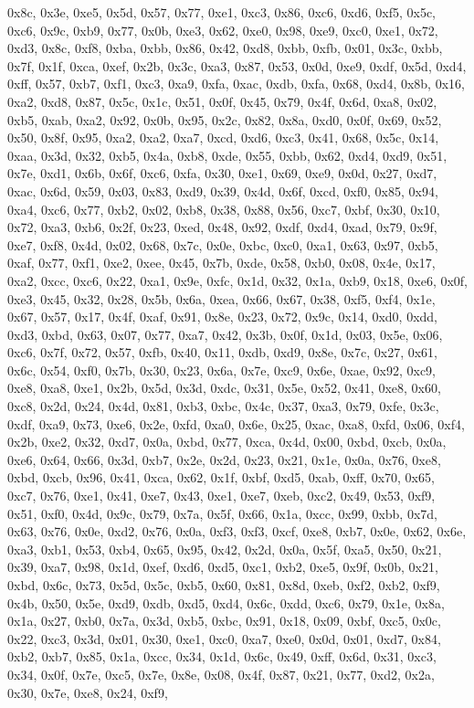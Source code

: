 \documentclass[
]{book}
\begin{document}
0x8c, 0x3e, 0xe5, 0x5d, 0x57, 0x77, 0xe1, 0xc3, 0x86, 0xc6, 0xd6, 0xf5, 0x5c, 0xc6, 0x9c, 0xb9, 0x77, 0x0b, 0xe3, 0x62, 0xe0, 0x98, 0xe9, 0xc0, 0xe1, 0x72, 0xd3, 0x8c, 0xf8, 0xba, 0xbb, 0x86, 0x42, 0xd8, 0xbb, 0xfb, 0x01, 0x3c, 0xbb, 0x7f, 0x1f, 0xca, 0xef, 0x2b, 0x3c, 0xa3, 0x87, 0x53, 0x0d, 0xe9, 0xdf, 0x5d, 0xd4, 0xff, 0x57, 0xb7, 0xf1, 0xc3, 0xa9, 0xfa, 0xac, 0xdb, 0xfa, 0x68, 0xd4, 0x8b, 0x16, 0xa2, 0xd8, 0x87, 0x5c, 0x1c, 0x51, 0x0f, 0x45, 0x79, 0x4f, 0x6d, 0xa8, 0x02, 0xb5, 0xab, 0xa2, 0x92,
0x0b, 0x95, 0x2c, 0x82, 0x8a, 0xd0, 0x0f, 0x69, 0x52, 0x50, 0x8f, 0x95, 0xa2, 0xa2, 0xa7, 0xcd, 0xd6, 0xc3, 0x41, 0x68, 0x5c, 0x14, 0xaa, 0x3d, 0x32, 0xb5, 0x4a, 0xb8, 0xde, 0x55, 0xbb, 0x62, 0xd4, 0xd9, 0x51, 0x7e, 0xd1, 0x6b, 0x6f, 0xc6, 0xfa, 0x30, 0xe1, 0x69, 0xe9, 0x0d, 0x27, 0xd7, 0xac, 0x6d, 0x59, 0x03, 0x83, 0xd9, 0x39, 0x4d, 0x6f, 0xcd, 0xf0, 0x85, 0x94, 0xa4, 0xc6, 0x77, 0xb2, 0x02, 0xb8, 0x38, 0x88, 0x56, 0xc7, 0xbf, 0x30, 0x10, 0x72, 0xa3, 0xb6, 0x2f, 0x23, 0xed, 0x48, 0x92, 0xdf, 0xd4,
0xad, 0x79, 0x9f, 0xe7, 0xf8, 0x4d, 0x02, 0x68, 0x7c, 0x0e, 0xbc, 0xc0, 0xa1, 0x63, 0x97, 0xb5, 0xaf, 0x77, 0xf1, 0xe2, 0xee, 0x45, 0x7b, 0xde, 0x58, 0xb0, 0x08, 0x4e, 0x17, 0xa2, 0xcc, 0xc6, 0x22, 0xa1, 0x9e, 0xfc, 0x1d, 0x32, 0x1a, 0xb9, 0x18, 0xe6, 0x0f, 0xe3, 0x45, 0x32, 0x28, 0x5b, 0x6a, 0xea, 0x66, 0x67, 0x38, 0xf5, 0xf4, 0x1e, 0x67, 0x57, 0x17, 0x4f, 0xaf, 0x91, 0x8e, 0x23, 0x72, 0x9c, 0x14, 0xd0, 0xdd, 0xd3, 0xbd, 0x63, 0x07, 0x77, 0xa7, 0x42, 0x3b, 0x0f, 0x1d, 0x03, 0x5e, 0x06, 0xc6, 0x7f,
0x72, 0x57, 0xfb, 0x40, 0x11, 0xdb, 0xd9, 0x8e, 0x7c, 0x27, 0x61, 0x6c, 0x54, 0xf0, 0x7b, 0x30, 0x23, 0x6a, 0x7e, 0xc9, 0x6e, 0xae, 0x92, 0xc9, 0xe8, 0xa8, 0xe1, 0x2b, 0x5d, 0x3d, 0xdc, 0x31, 0x5e, 0x52, 0x41, 0xe8, 0x60, 0xc8, 0x2d, 0x24, 0x4d, 0x81, 0xb3, 0xbc, 0x4c, 0x37, 0xa3, 0x79, 0xfe, 0x3c, 0xdf, 0xa9, 0x73, 0xe6, 0x2e, 0xfd, 0xa0, 0x6e, 0x25, 0xac, 0xa8, 0xfd, 0x06, 0xf4, 0x2b, 0xe2, 0x32, 0xd7, 0x0a, 0xbd, 0x77, 0xca, 0x4d, 0x00, 0xbd, 0xcb, 0x0a, 0xe6, 0x64, 0x66, 0x3d, 0xb7, 0x2e, 0x2d,
0x23, 0x21, 0x1e, 0x0a, 0x76, 0xe8, 0xbd, 0xcb, 0x96, 0x41, 0xca, 0x62, 0x1f, 0xbf, 0xd5, 0xab, 0xff, 0x70, 0x65, 0xc7, 0x76, 0xe1, 0x41, 0xe7, 0x43, 0xe1, 0xe7, 0xeb, 0xc2, 0x49, 0x53, 0xf9, 0x51, 0xf0, 0x4d, 0x9c, 0x79, 0x7a, 0x5f, 0x66, 0x1a, 0xcc, 0x99, 0xbb, 0x7d, 0x63, 0x76, 0x0e, 0xd2, 0x76, 0x0a, 0xf3, 0xf3, 0xcf, 0xe8, 0xb7, 0x0e, 0x62, 0x6e, 0xa3, 0xb1, 0x53, 0xb4, 0x65, 0x95, 0x42, 0x2d, 0x0a, 0x5f, 0xa5, 0x50, 0x21, 0x39, 0xa7, 0x98, 0x1d, 0xef, 0xd6, 0xd5, 0xc1, 0xb2, 0xe5, 0x9f, 0x0b,
0x21, 0xbd, 0x6c, 0x73, 0x5d, 0x5c, 0xb5, 0x60, 0x81, 0x8d, 0xeb, 0xf2, 0xb2, 0xf9, 0x4b, 0x50, 0x5e, 0xd9, 0xdb, 0xd5, 0xd4, 0x6c, 0xdd, 0xc6, 0x79, 0x1e, 0x8a, 0x1a, 0x27, 0xb0, 0x7a, 0x3d, 0xb5, 0xbc, 0x91, 0x18, 0x09, 0xbf, 0xc5, 0x0c, 0x22, 0xc3, 0x3d, 0x01, 0x30, 0xe1, 0xc0, 0xa7, 0xe0, 0x0d, 0x01, 0xd7, 0x84, 0xb2, 0xb7, 0x85, 0x1a, 0xcc, 0x34, 0x1d, 0x6c, 0x49, 0xff, 0x6d, 0x31, 0xc3, 0x34, 0x0f, 0x7e, 0xc5, 0x7e, 0x8e, 0x08, 0x4f, 0x87, 0x21, 0x77, 0xd2, 0x2a, 0x30, 0x7e, 0xe8, 0x24, 0xf9,
\end{document}
